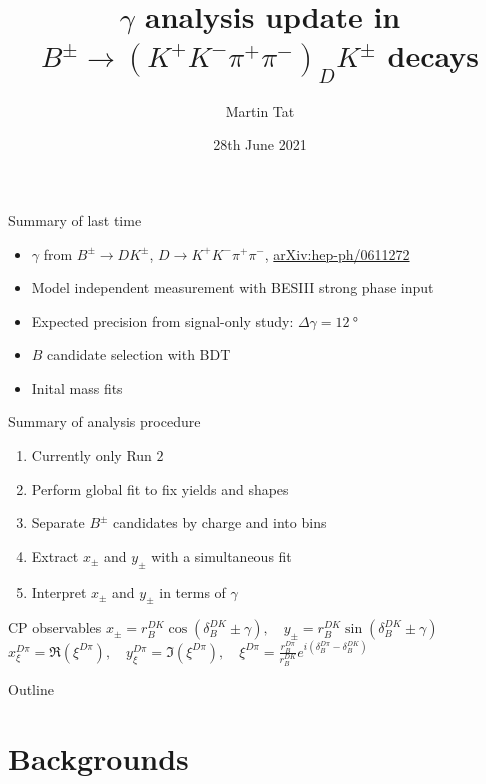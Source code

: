 \documentclass{beamer}
\title[$B^\pm\to(K^+K^-\pi^+\pi^-)_DK^\pm$]{\texorpdfstring{$\gamma$}{gamma} analysis update in \texorpdfstring{$B^\pm\to(K^+K^-\pi^+\pi^-)_DK^\pm$}{B to K+K-pi+pi-} decays}
\author{Martin Tat}
\institute{Oxford LHCb}
\date{28th June 2021}
\begin{document}
\begin{frame}
  \titlepage
\end{frame}

\begin{frame}{Summary of last time}
  \begin{itemize}
    \setlength\itemsep{1.5em}
    \item{$\gamma$ from $B^\pm\to DK^\pm$, $D\to K^+K^-\pi^+\pi^-$, \href{https://arxiv.org/abs/hep-ph/0611272}{arXiv:hep-ph/0611272}}
    \item{Model independent measurement with BESIII strong phase input}
    \item{Expected precision from signal-only study: $\Delta\gamma = \SI{12}{\degree}$}
    \item{$B$ candidate selection with BDT}
    \item{Inital mass fits}
  \end{itemize}
\end{frame}

\begin{frame}{Summary of analysis procedure}
  \begin{enumerate}
    \setlength\itemsep{1.5em}
      \item{Currently only Run $2$}
      \item{Perform global fit to fix yields and shapes}
      \item{Separate $B^\pm$ candidates by charge and into bins}
      \item{Extract $x_\pm$ and $y_\pm$ with a simultaneous fit}
      \item{Interpret $x_\pm$ and $y_\pm$ in terms of $\gamma$}
  \end{enumerate}
  \begin{block}{CP observables}
    $x_\pm = r_B^{DK}\cos(\delta_B^{DK}\pm\gamma), \quad y_\pm = r_B^{DK}\sin(\delta_B^{DK}\pm\gamma)$ \\
    $x_\xi^{D\pi} = \Re(\xi^{D\pi}), \quad y_\xi^{D\pi} = \Im(\xi^{D\pi}), \quad \xi^{D\pi} = \frac{r_B^{D\pi}}{r_B^{DK}}e^{i(\delta_B^{D\pi} - \delta_B^{DK})}$
  \end{block}
\end{frame}

\begin{frame}{Outline}
  \tableofcontents
\end{frame}

\section{Backgrounds}
\end{document}
